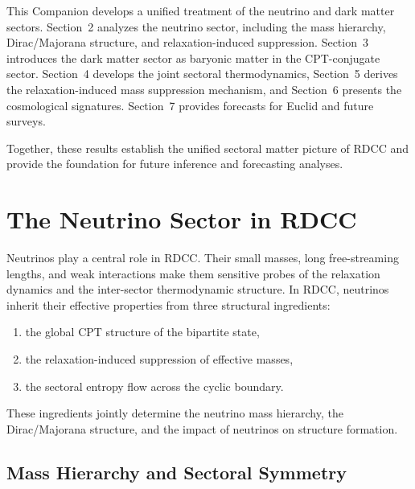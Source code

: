 \documentclass[11pt,a4paper]{article}
\begin{document}
This Companion develops a unified treatment of the neutrino and dark matter
sectors. Section~2 analyzes the neutrino sector, including the mass hierarchy,
Dirac/Majorana structure, and relaxation-induced suppression. Section~3
introduces the dark matter sector as baryonic matter in the CPT-conjugate
sector. Section~4 develops the joint sectoral thermodynamics, Section~5 derives
the relaxation-induced mass suppression mechanism, and Section~6 presents the
cosmological signatures. Section~7 provides forecasts for Euclid and future
surveys.

Together, these results establish the unified sectoral matter picture of RDCC
and provide the foundation for future inference and forecasting analyses.




\section{The Neutrino Sector in RDCC}

Neutrinos play a central role in RDCC. Their small masses, long free-streaming
lengths, and weak interactions make them sensitive probes of the relaxation
dynamics and the inter-sector thermodynamic structure. In RDCC, neutrinos
inherit their effective properties from three structural ingredients:

\begin{enumerate}[label=(\alph*)]
    \item the global CPT structure of the bipartite state,
    \item the relaxation-induced suppression of effective masses,
    \item the sectoral entropy flow across the cyclic boundary.
\end{enumerate}

These ingredients jointly determine the neutrino mass hierarchy, the
Dirac/Majorana structure, and the impact of neutrinos on structure formation.




\subsection{Mass Hierarchy and Sectoral Symmetry}
\end{document}
